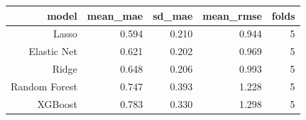 \begin{tabular}{@{}rrrrr@{}}
\toprule
model & mean\_mae & sd\_mae & mean\_rmse & folds \\
\midrule
Lasso & 0.594 & 0.210 & 0.944 & 5 \\
Elastic Net & 0.621 & 0.202 & 0.969 & 5 \\
Ridge & 0.648 & 0.206 & 0.993 & 5 \\
Random Forest & 0.747 & 0.393 & 1.228 & 5 \\
XGBoost & 0.783 & 0.330 & 1.298 & 5 \\
\bottomrule
\end{tabular}
